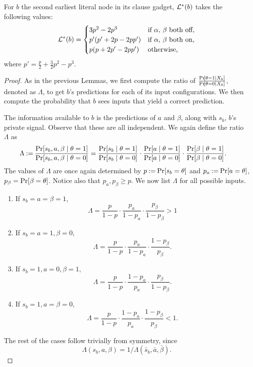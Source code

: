 \begin{lemma}\label{lemma:bayesian_l2_LR}
    For $b$ the second earliest literal node in its clause gadget, $\mathcal{L}^*(b)$ takes the following values:
    \begin{align*}
        \mathcal{L}^*(b) = \begin{cases}
        3p^2-2p^3 & \text{if $ \alpha $, $ \beta $ both off,} \\
        p'(p'+2p-2pp') & \text{if $ \alpha $, $ \beta $ both on,} \\
        p(p+2p'-2pp') & \text{otherwise,} \\
    \end{cases}
    \end{align*}
    where $p' = \frac p2 + \frac 32 p^2 - p^3 $.
\end{lemma}
\begin{proof}
    As in the previous Lemmas, we first compute the ratio of $ \frac{\Pr\!\left[ \theta=1 \mid X_b \right]}{\Pr\!\left[ \theta=0 \mid X_b \right]} $, denoted as $ \Lambda $, to get $ b $'s predictions for each of its input configurations. We then compute the probability that $b$ sees inputs that yield a correct prediction.

    The information available to $ b $ is the predictions of $ a $ and $ \beta $, along with $ s_b $, $ b $'s private signal.
    Observe that these are all independent.
    We again define the ratio $ \Lambda $ as \begin{align*}
        \Lambda &\mathbin{:=} \frac {\Pr[s_b, a, \beta \mid \theta = 1]} {\Pr[s_b, a, \beta \mid \theta = 0]} = \frac {\Pr[s_b \mid \theta = 1]} {\Pr[s_b \mid \theta = 0]} \cdot \frac {\Pr[ a \mid \theta = 1]} {\Pr[a \mid \theta = 0]}\cdot\frac {\Pr[ \beta \mid \theta = 1]} {\Pr[\beta \mid \theta = 0]}.
    \end{align*}
    The values of $ \Lambda $ are once again determined by $ p \mathbin{:=} \Pr\!\left[ s_b = \theta \right] $ and $ p_a \mathbin{:=} \Pr\!\left[ a = \theta \right] $, $ p_\beta = \Pr\!\left[ \beta = \theta \right] $.
    Notice also that $ p_a, p_\beta \geq p $. We now list $\Lambda$ for all possible inputs.

    \begin{enumerate}[ref=(\theenumi)]
        \item If $ s_b = a = \beta = 1 $, \[
            \Lambda = \frac p{1-p} \cdot \frac {p_a}{1-p_a} \cdot \frac {p_\beta}{1-p_\beta} > 1
        \]
    \item\label{badcase1} If $ s_b = a = 1, \beta = 0 $, \[
                \Lambda = \frac p{1-p} \cdot \frac {p_a}{1-p_a} \cdot \frac {1-p_\beta}{p_\beta}.
            \]
        \item\label{badcase2} If $ s_b = 1,  a = 0, \beta = 1 $, \[
                \Lambda = \frac p{1-p} \cdot \frac {1-p_a}{p_a} \cdot \frac {p_\beta}{1-p_\beta}.
            \]
	\item If $ s_b = 1,  a = \beta = 0 $, \[
                \Lambda = \frac p{1-p} \cdot \frac {1-p_a}{p_a} \cdot \frac {1-p_\beta}{p_\beta} < 1.
            \]
    \end{enumerate}
    The rest of the cases follow trivially from symmetry, since
    \[
        \Lambda(s_b, a, \beta) = 1/\Lambda(\bar s_b, \bar a, \bar \beta).
    \]


\end{proof}
